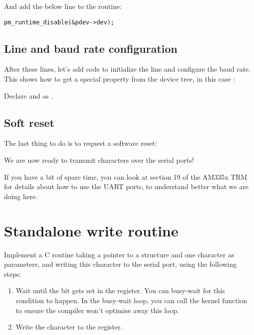 And add the below line to the  routine:

\begin{verbatim}
pm_runtime_disable(&pdev->dev);
\end{verbatim}

\subsection{Line and baud rate configuration}

After these lines, let's add code to initialize the line
and configure the baud rate. This shows how to get a special
property from the device tree, in this case :


Declare  and  as .

\subsection{Soft reset}

The last thing to do is to request a software reset:


We are now ready to transmit characters over the serial ports!

If you have a bit of spare time, you can look at section 19 of the
AM335x TRM for details about how to use the UART ports, to understand
better what we are doing here.

\section{Standalone write routine}

Implement a C routine taking a pointer to a 
structure and one character as parameters, and writing
this character to the serial port, using the following steps:

\begin{enumerate}
\item Wait until the  bit gets set in the
   register.  You can busy-wait for this condition to happen.
  In the busy-wait loop, you can call the  kernel function
  to ensure the compiler won't optimise away this loop.
\item Write the character to the  register.
\end{enumerate}


